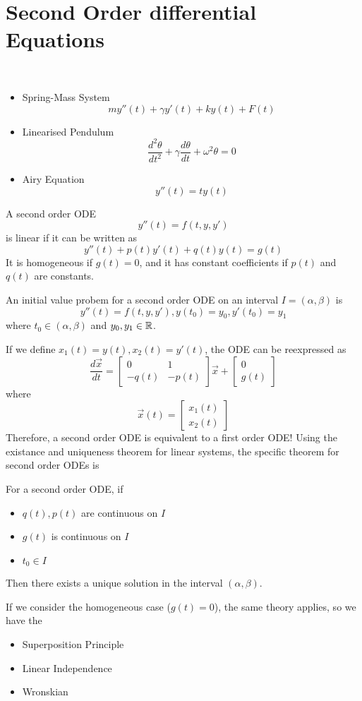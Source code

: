 \documentclass[12pt]{article}
\begin{document}
\section{Second Order differential Equations}

\begin{ex}
	\text{ }\\
	\begin{itemize}
		\item Spring-Mass System
			$$my''(t) + \gamma y'(t) + ky(t) + F(t)$$
		\item Linearised Pendulum
			$$\frac{d^2\theta}{dt^2} + \gamma \frac{d\theta}{dt} + \omega^2\theta = 0$$
		\item Airy Equation
			$$y''(t) = ty(t)$$
	\end{itemize}
\end{ex}



\begin{defn}
	A second order ODE
	$$y''(t) = f(t,y,y')$$
	is linear if it can be written as
	$$y''(t) + p(t)y'(t) + q(t)y(t) = g(t)$$
	It is homogeneous if $g(t)=0$, and it has constant coefficients if $p(t)$ and $q(t)$ are constants.
\end{defn}

\begin{defn}
	An initial value probem for a second order ODE on an interval $I = (\alpha,\beta)$ is
	$$y''(t)=f(t,y,y'), y(t_0) = y_0, y'(t_0) = y_1$$
	where $t_0\in(\alpha,\beta)$ and $y_0,y_1\in\mathbb{R}$.
\end{defn}

If we define $x_1(t) = y(t), x_2(t) = y'(t)$, the ODE can be reexpressed as
$$\frac{d\vec{x}}{dt} = \begin{bmatrix} 0 & 1 \\ -q(t) & -p(t) \end{bmatrix} \vec{x} + \begin{bmatrix} 0 \\ g(t)\end{bmatrix}$$
where
$$\vec{x}(t) = \begin{bmatrix} x_1(t) \\ x_2(t)\end{bmatrix}$$
Therefore, a second order ODE is equivalent to a first order ODE! Using the existance and uniqueness theorem for linear systems, the specific theorem for second order ODEs is

\begin{thm}
	For a second order ODE, if
	\begin{itemize}
		\item $q(t), p(t)$ are continuous on $I$
		\item $g(t)$ is continuous on $I$
		\item $t_0 \in I$
	\end{itemize}
	Then there exists a unique solution in the interval $(\alpha,\beta)$.
\end{thm}

If we consider the homogeneous case ($g(t)=0$), the same theory applies, so we have the
\begin{itemize}
	\item Superposition Principle
	\item Linear Independence
	\item Wronskian
\end{itemize}
\end{document}
